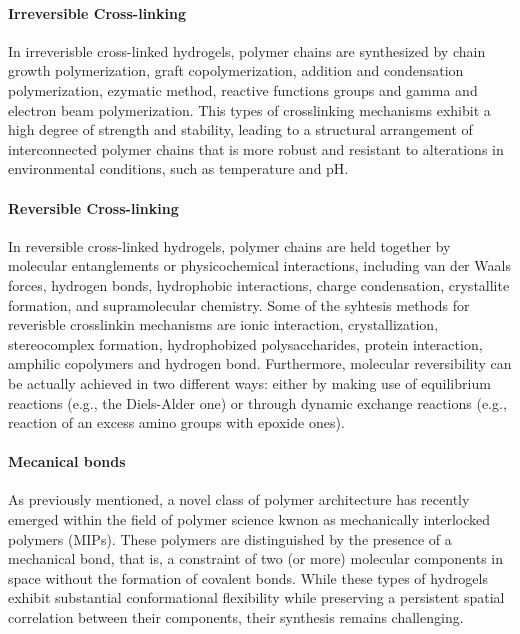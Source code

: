 \paragraph{Irreversible Cross-linking}
In irreverisble cross-linked hydrogels, polymer chains are synthesized by chain growth polymerization, graft copolymerization, addition and condensation polymerization, ezymatic method, reactive functions groups and gamma and electron beam polymerization\citep{maitraCrosslinkingHydrogelsReview2014,bustamantetorresHydrogelsClassificationAccording2021}.
This types of crosslinking mechanisms exhibit a high degree of strength and stability, leading to a structural arrangement of interconnected polymer chains that is more robust and resistant to alterations in environmental conditions, such as temperature and pH\citep{maitraCrosslinkingHydrogelsReview2014}.


\paragraph{Reversible Cross-linking}
In reversible cross-linked hydrogels, polymer chains are held together by molecular entanglements or physicochemical interactions, including van der Waals forces, hydrogen bonds, hydrophobic interactions, charge condensation, crystallite formation, and supramolecular chemistry\citep{bustamantetorresHydrogelsClassificationAccording2021,maitraCrosslinkingHydrogelsReview2014}.
Some of the syhtesis methods for reverisble crosslinkin mechanisms are ionic interaction, crystallization, stereocomplex formation, hydrophobized polysaccharides, protein interaction, amphilic copolymers and hydrogen bond\citep{maitraCrosslinkingHydrogelsReview2014,bustamantetorresHydrogelsClassificationAccording2021}.
Furthermore, molecular reversibility can be actually achieved in two different ways: either by making use of equilibrium reactions (e.g., the Diels-Alder one) or through dynamic exchange reactions (e.g., reaction of an excess amino groups with epoxide ones)\citep{picchioniHydrogelsBasedDynamic2018}. 


\paragraph{Mecanical bonds}
As previously mentioned, a novel class of polymer architecture has recently emerged within the field of polymer science kwnon as mechanically interlocked polymers (MIPs). 
These polymers are distinguished by the presence of a mechanical bond, that is, a constraint of two (or more) molecular components in space without the formation of covalent bonds\citep{hartMaterialPropertiesApplications2021}.
While these types of hydrogels exhibit substantial conformational flexibility while preserving a persistent spatial correlation between their components, their synthesis remains challenging.

